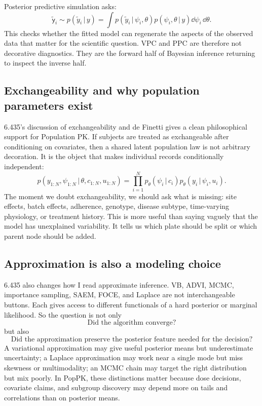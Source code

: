 \documentclass[a4paper]{article}
\newcommand{\rv}[1]{\mathsf{#1}}
\newcommand{\given}{\,|\,}
\begin{document}
Posterior predictive simulation asks:
\[
  \tilde{\rv{y}}_i
  \sim
  p(\tilde y_i\given y)
  =
  \int
  p(\tilde y_i\given \psi_i,\theta)
  p(\psi_i,\theta\given y)
  \dd\psi_i\,\dd\theta.
\]
This checks whether the fitted model can regenerate the aspects of the observed data that matter for the scientific question.  VPC and PPC are therefore not decorative diagnostics.  They are the forward half of Bayesian inference returning to inspect the inverse half.

\subsection{Exchangeability and why population parameters exist}

6.435's discussion of exchangeability and de Finetti gives a clean philosophical support for Population PK.  If subjects are treated as exchangeable after conditioning on covariates, then a shared latent population law is not arbitrary decoration.  It is the object that makes individual records conditionally independent:
\[
  p(y_{1:N},\psi_{1:N}\given\theta,c_{1:N},u_{1:N})
  =
  \prod_{i=1}^N
  p_\theta(\psi_i\given c_i)
  p_\theta(y_i\given\psi_i,u_i).
\]
The moment we doubt exchangeability, we should ask what is missing: site effects, batch effects, adherence, genotype, disease subtype, time-varying physiology, or treatment history.  This is more useful than saying vaguely that the model has unexplained variability.  It tells us which plate should be split or which parent node should be added.

\subsection{Approximation is also a modeling choice}

6.435 also changes how I read approximate inference.  VB, ADVI, MCMC, importance sampling, SAEM, FOCE, and Laplace are not interchangeable buttons.  Each gives access to different functionals of a hard posterior or marginal likelihood.  So the question is not only
\[
  \text{Did the algorithm converge?}
\]
but also
\[
  \text{Did the approximation preserve the posterior feature needed for the decision?}
\]
A variational approximation may give useful posterior means but underestimate uncertainty; a Laplace approximation may work near a single mode but miss skewness or multimodality; an MCMC chain may target the right distribution but mix poorly.  In PopPK, these distinctions matter because dose decisions, covariate claims, and subgroup discovery may depend more on tails and correlations than on posterior means.
\end{document}

